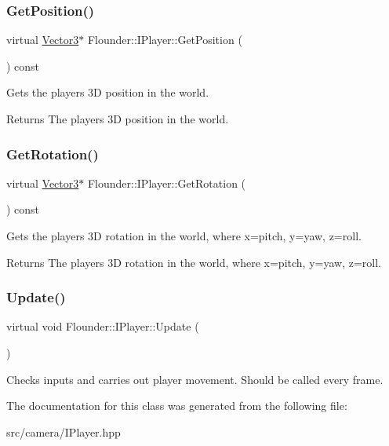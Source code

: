 \subsubsection{\texorpdfstring{Get\+Position()}{GetPosition()}}
{\footnotesize\ttfamily virtual \hyperlink{class_flounder_1_1_vector3}{Vector3}$\ast$ Flounder\+::\+I\+Player\+::\+Get\+Position (\begin{DoxyParamCaption}{ }\end{DoxyParamCaption}) const\hspace{0.3cm}{\ttfamily [pure virtual]}}



Gets the players 3D position in the world. 

\begin{DoxyReturn}{Returns}
The players 3D position in the world. 
\end{DoxyReturn}
\mbox{\label{class_flounder_1_1_i_player_afbc9c1d2a367f1a9407554f5614775b6}} 
\subsubsection{\texorpdfstring{Get\+Rotation()}{GetRotation()}}
{\footnotesize\ttfamily virtual \hyperlink{class_flounder_1_1_vector3}{Vector3}$\ast$ Flounder\+::\+I\+Player\+::\+Get\+Rotation (\begin{DoxyParamCaption}{ }\end{DoxyParamCaption}) const\hspace{0.3cm}{\ttfamily [pure virtual]}}



Gets the players 3D rotation in the world, where x=pitch, y=yaw, z=roll. 

\begin{DoxyReturn}{Returns}
The players 3D rotation in the world, where x=pitch, y=yaw, z=roll. 
\end{DoxyReturn}
\mbox{\label{class_flounder_1_1_i_player_aa1f0636f26824c08409370769d63d570}} 
\subsubsection{\texorpdfstring{Update()}{Update()}}
{\footnotesize\ttfamily virtual void Flounder\+::\+I\+Player\+::\+Update (\begin{DoxyParamCaption}{ }\end{DoxyParamCaption})\hspace{0.3cm}{\ttfamily [pure virtual]}}



Checks inputs and carries out player movement. Should be called every frame. 



The documentation for this class was generated from the following file\+:\begin{DoxyCompactItemize}
\item 
src/camera/I\+Player.\+hpp\end{DoxyCompactItemize}
